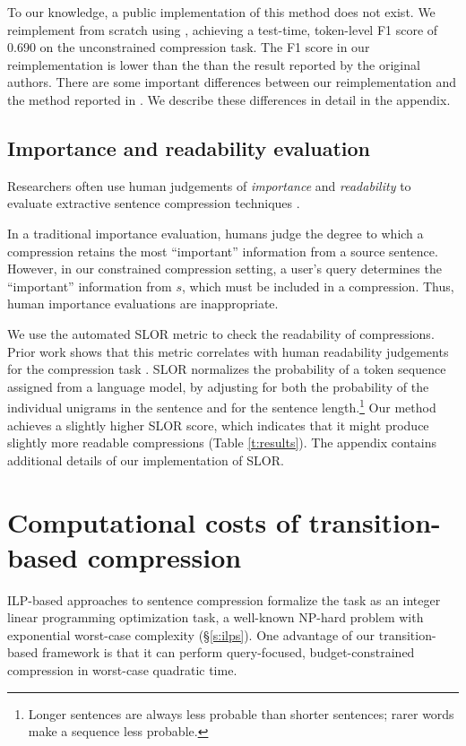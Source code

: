 \documentclass[11pt,a4paper]{article}
\begin{document}
To our knowledge, a public implementation of this method does not exist. We reimplement from scratch using \citet{gurobi}, achieving a test-time, token-level F1 score of  0.690 on the unconstrained compression task. The F1 score in our reimplementation is lower than the than the result reported by the original authors. There are some important differences between our reimplementation and the method reported in \citet{filippova2013overcoming}. We describe these differences in detail in the appendix.

\subsection{Importance and readability evaluation}\label{s:readabilityinformativeness}

Researchers often use human judgements of \textit{importance} and \textit{readability} to evaluate extractive sentence compression techniques \cite{Knight2000StatisticsBasedS,clarke2008global,filippova2015sentence}. 

In a traditional importance evaluation, humans judge the degree to which a compression retains the most ``important'' information from a source sentence. However, in our constrained compression setting, a user's query determines the ``important'' information from $s$, which must be included in a compression. Thus, human importance evaluations are inappropriate.
 
We use the automated SLOR metric \cite{lau2015unsupervised} to check the readability of compressions. Prior work shows that this metric correlates with human readability judgements for the compression task \cite{kannConl}. SLOR normalizes the probability of a token sequence assigned from a language model, by adjusting for both the probability of the individual unigrams in the sentence and for the sentence length.\footnote{Longer sentences are always less probable than shorter sentences; rarer words make a sequence less probable.} Our method achieves a slightly higher SLOR score, which indicates that it might produce slightly more readable compressions (Table \ref{t:results}). The appendix contains additional details of our implementation of SLOR. 

\section{Computational costs of transition-based compression}\label{s:costs}

ILP-based approaches to sentence compression formalize the task as an integer linear programming optimization task, a well-known NP-hard problem with exponential worst-case complexity (\S\ref{s:ilps}). One advantage of our transition-based framework is that it can perform query-focused, budget-constrained compression in worst-case quadratic time. 
\end{document}
